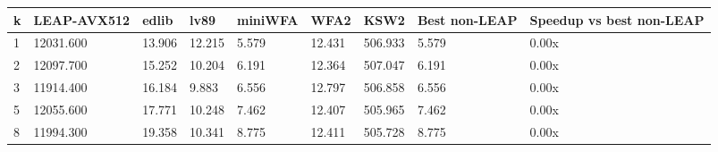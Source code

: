 \begin{tabular}{lllllllll}
\hline
k & LEAP-AVX512 & edlib & lv89 & miniWFA & WFA2 & KSW2 & Best non-LEAP & Speedup vs best non-LEAP \\
\hline
1 & 12031.600 & 13.906 & 12.215 & 5.579 & 12.431 & 506.933 & 5.579 & 0.00x \\
2 & 12097.700 & 15.252 & 10.204 & 6.191 & 12.364 & 507.047 & 6.191 & 0.00x \\
3 & 11914.400 & 16.184 & 9.883 & 6.556 & 12.797 & 506.858 & 6.556 & 0.00x \\
5 & 12055.600 & 17.771 & 10.248 & 7.462 & 12.407 & 505.965 & 7.462 & 0.00x \\
8 & 11994.300 & 19.358 & 10.341 & 8.775 & 12.411 & 505.728 & 8.775 & 0.00x \\
\hline
\end{tabular}
